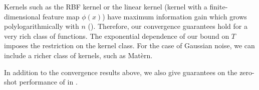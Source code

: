 Kernels such as the RBF kernel or the linear kernel (kernel with a finite-dimensional feature map $\phi(x)$) have maximum information gain which grows polylogarithmically with $n$ (\citet{vakili2021information}). Therefore, our convergence guarantees hold for a very rich class of functions.
The exponential dependence of our bound on $T$ imposes the restriction on the kernel class. For the case of Gaussian noise, we can include a richer class of kernels, such as Matèrn.

In addition to the convergence results above, we also give guarantees on the zero-shot performance of \opacex in .
